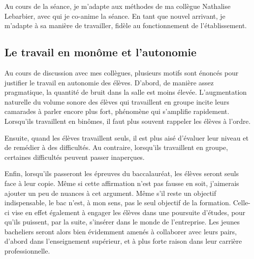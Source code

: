 \documentclass[pdftex,a4paper,12pt]{article}
\begin{document}
	Au cours de la séance, je m'adapte aux méthodes de ma collègue Nathalise Lebarbier, avec qui je co-anime la séance.
	En tant que nouvel arrivant, je m'adapte à sa manière de travailler, fidèle au fonctionnement de l'établissement.

	\subsection{Le travail en monôme et l'autonomie}

	Au cours de discussion avec mes collègues, plusieurs motifs sont énoncés pour justifier le travail en autonomie des élèves.
	D'abord, de manière assez pragmatique, la quantité de bruit dans la salle est moins élevée. 
	L'augmentation naturelle du volume sonore des élèves qui travaillent en groupe incite leurs camarades à parler encore plus fort, phénomène qui s'amplifie rapidement. 
	Lorsqu'ils travaillent en binômes, il faut plus souvent rappeler les élèves à l'ordre.

	Ensuite, quand les élèves travaillent seuls, il est plus aisé d'évaluer leur niveau et de remédier à des difficultés. 
	Au contraire, lorsqu'ils travaillent en groupe, certaines difficultés peuvent passer inaperçues.

	Enfin, lorsqu'ils passeront les épreuves du baccalauréat, les élèves seront seuls face à leur copie.
	Même si cette affirmation n'est pas fausse en soit, j'aimerais ajouter un peu de nuances à cet argument.
	Même s'il reste un objectif indispensable, le bac n'est, à mon sens, pas le seul objectif de la formation.
	Celle-ci vise en effet également à engager les élèves dans une poursuite d'études, pour qu'ils puissent, par la suite, s'insérer dans le monde de l'entreprise.
	Les jeunes bacheliers seront alors bien évidemment amenés à collaborer avec leurs pairs, 
	d'abord dans l'enseignement supérieur, et à plus forte raison dans leur carrière professionnelle.\\
\end{document}
